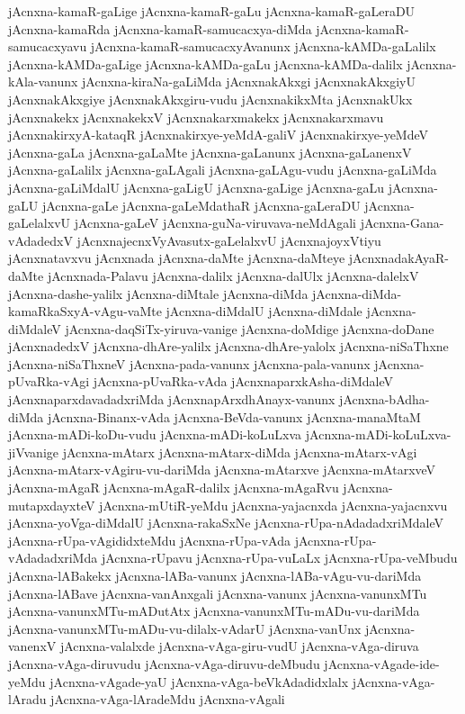 {jAcnxna-kamaR-gaLige
jAcnxna-kamaR-gaLu
jAcnxna-kamaR-gaLeraDU
jAcnxna-kamaRda
jAcnxna-kamaR-samucacxya-diMda
jAcnxna-kamaR-samucacxyavu
jAcnxna-kamaR-samucacxyAvanunx
jAcnxna-kAMDa-gaLalilx
jAcnxna-kAMDa-gaLige
jAcnxna-kAMDa-gaLu
jAcnxna-kAMDa-dalilx
jAcnxna-kAla-vanunx
jAcnxna-kiraNa-gaLiMda
jAcnxnakAkxgi
jAcnxnakAkxgiyU
jAcnxnakAkxgiye
jAcnxnakAkxgiru-vudu
jAcnxnakikxMta
jAcnxnakUkx
jAcnxnakekx
jAcnxnakekxV
jAcnxnakarxmakekx
jAcnxnakarxmavu
jAcnxnakirxyA-kataqR
jAcnxnakirxye-yeMdA-galiV
jAcnxnakirxye-yeMdeV
jAcnxna-gaLa
jAcnxna-gaLaMte
jAcnxna-gaLanunx
jAcnxna-gaLanenxV
jAcnxna-gaLalilx
jAcnxna-gaLAgali
jAcnxna-gaLAgu-vudu
jAcnxna-gaLiMda
jAcnxna-gaLiMdalU
jAcnxna-gaLigU
jAcnxna-gaLige
jAcnxna-gaLu
jAcnxna-gaLU
jAcnxna-gaLe
jAcnxna-gaLeMdathaR
jAcnxna-gaLeraDU
jAcnxna-gaLelalxvU
jAcnxna-gaLeV
jAcnxna-guNa-viruvava-neMdAgali
jAcnxna-Gana-vAdadedxV
jAcnxnajecnxVyAvasutx-gaLelalxvU
jAcnxnajoyxVtiyu
jAcnxnatavxvu
jAcnxnada
jAcnxna-daMte
jAcnxna-daMteye
jAcnxnadakAyaR-daMte
jAcnxnada-Palavu
jAcnxna-dalilx
jAcnxna-dalUlx
jAcnxna-dalelxV
jAcnxna-dashe-yalilx
jAcnxna-diMtale
jAcnxna-diMda
jAcnxna-diMda-kamaRkaSxyA-vAgu-vaMte
jAcnxna-diMdalU
jAcnxna-diMdale
jAcnxna-diMdaleV
jAcnxna-daqSiTx-yiruva-vanige
jAcnxna-doMdige
jAcnxna-doDane
jAcnxnadedxV
jAcnxna-dhAre-yalilx
jAcnxna-dhAre-yalolx
jAcnxna-niSaThxne
jAcnxna-niSaThxneV
jAcnxna-pada-vanunx
jAcnxna-pala-vanunx
jAcnxna-pUvaRka-vAgi
jAcnxna-pUvaRka-vAda
jAcnxnaparxkAsha-diMdaleV
jAcnxnaparxdavadadxriMda
jAcnxnapArxdhAnayx-vanunx
jAcnxna-bAdha-diMda
jAcnxna-Binanx-vAda
jAcnxna-BeVda-vanunx
jAcnxna-manaMtaM
jAcnxna-mADi-koDu-vudu
jAcnxna-mADi-koLuLxva
jAcnxna-mADi-koLuLxva-jiVvanige
jAcnxna-mAtarx
jAcnxna-mAtarx-diMda
jAcnxna-mAtarx-vAgi
jAcnxna-mAtarx-vAgiru-vu-dariMda
jAcnxna-mAtarxve
jAcnxna-mAtarxveV
jAcnxna-mAgaR
jAcnxna-mAgaR-dalilx
jAcnxna-mAgaRvu
jAcnxna-mutapxdayxteV
jAcnxna-mUtiR-yeMdu
jAcnxna-yajacnxda
jAcnxna-yajacnxvu
jAcnxna-yoVga-diMdalU
jAcnxna-rakaSxNe
jAcnxna-rUpa-nAdadadxriMdaleV
jAcnxna-rUpa-vAgididxteMdu
jAcnxna-rUpa-vAda
jAcnxna-rUpa-vAdadadxriMda
jAcnxna-rUpavu
jAcnxna-rUpa-vuLaLx
jAcnxna-rUpa-veMbudu
jAcnxna-lABakekx
jAcnxna-lABa-vanunx
jAcnxna-lABa-vAgu-vu-dariMda
jAcnxna-lABave
jAcnxna-vanAnxgali
jAcnxna-vanunx
jAcnxna-vanunxMTu
jAcnxna-vanunxMTu-mADutAtx
jAcnxna-vanunxMTu-mADu-vu-dariMda
jAcnxna-vanunxMTu-mADu-vu-dilalx-vAdarU
jAcnxna-vanUnx
jAcnxna-vanenxV
jAcnxna-valalxde
jAcnxna-vAga-giru-vudU
jAcnxna-vAga-diruva
jAcnxna-vAga-diruvudu
jAcnxna-vAga-diruvu-deMbudu
jAcnxna-vAgade-ide-yeMdu
jAcnxna-vAgade-yaU
jAcnxna-vAga-beVkAdadidxlalx
jAcnxna-vAga-lAradu
jAcnxna-vAga-lAradeMdu
jAcnxna-vAgali
}
